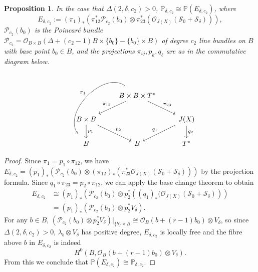 \documentclass{article}[12pt]
\newtheorem{proposition}[theorem]{Proposition}
\theoremstyle{definition}
\theoremstyle{remark}
\numberwithin{equation}{section}
\newcommand \mc{\mathcal}
\newcommand \mb{\mathbb}
\begin{document}
\begin{proposition}\label{Pnbundle}
    In the case that $\Delta(2,\delta,c_2)>0$, $\mb{P}_{\delta,c_2}\cong\mb{P}(E_{\delta,c_2})$, where $$E_{\delta,c_2}:=(\pi_1)_*\left(\pi_{12}^*\mc{P}_{c_2}(b_0)\otimes \pi_{23}^*\left(\mc{O}_{J(X)}\left(\mc{S}_0+\mc{S}_\delta\right)\right)\right),$$
    $\mc{P}_{c_2}(b_0)$ is the Poincar\'e bundle $\mc{P}_{c_2}=\mc{O}_{B\times B}(\Delta+(c_2-1)B\times\{b_0\}-\{b_0\}\times B)$ of degree $c_2$ line bundles on $B$ with base point $b_0\in B$, and the projections $\pi_{ij}, p_k,q_\ell$ are as in the commutative diagram below.
    $$\begin{tikzcd}
                                             & B \times B \times T^* \arrow[rd, "\pi_{23}"] \arrow[ldd, "\pi_1"', bend right=80, shift right=4] \arrow[ld, "\pi_{12}"'] &                                          \\
B\times B \arrow[d, "p_1"] \arrow[rd, "p_2"] &                                                                                                                          & J(X) \arrow[ld, "q_1"'] \arrow[d, "q_2"] \\
B                                            & B                                                                                                                        & T^*                                     
\end{tikzcd}$$
\end{proposition}
\begin{proof}
    Since $\pi_1=p_1\circ \pi_{12}$, we have $E_{\delta,c_2}=(p_1)_*\left(\mc{P}_{c_2}(b_0)\otimes (\pi_{12})_*\left(\pi_{23}^*\mc{O}_{J(X)}(\mc{S}_0+\mc{S}_\delta)\right)\right)$ by the projection formula. Since $q_1\circ\pi_{23}=p_2\circ\pi_{12}$, we can apply the base change theorem to obtain \begin{align*}E_{\delta,c_2}&\cong (p_1)_*\left(\mc{P}_{c_2}(b_0)\otimes p_2^*\left((q_1)_*(\mc{O}_{J(X)}(\mc{S}_0+\mc{S}_\delta)\right)\right)\\
    &=(p_1)_*\left(\mc{P}_{c_2}(b_0)\otimes p_2^*V_\delta\right).\end{align*}
    For any $b \in B$, $\left(\mc{P}_{c_2}(b_0)\otimes p_2^*V_\delta\right)|_{\{b\}\times B}\cong \mc{O}_B(b+(r-1)b_0)\otimes V_\delta$, so since $\Delta(2,\delta,c_2)>0$, $\lambda_b\otimes V_\delta$ has positive degree, $E_{\delta,c_2}$ is locally free and the fibre above $b$ in $E_{\delta,c_2}$ is indeed $$H^0(B, \mc{O}_{B}(b+(r-1)b_0)\otimes V_\delta).$$ From this we conclude that $\mb{P}(E_{\delta,c_2})\cong \mb{P}_{\delta,c_2}$.
\end{proof}
\end{document}
